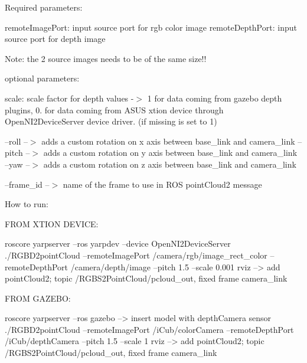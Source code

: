 Required parameters\+:

remote\+Image\+Port\+: input source port for rgb color image remote\+Depth\+Port\+: input source port for depth image

Note\+: the 2 source images needs to be of the same size!!

optional parameters\+:

scale\+: scale factor for depth values -\/$>$ 1 for data coming from gazebo depth plugins, 0. for data coming from A\+S\+US xtion device through Open\+N\+I2\+Device\+Server device driver. (if missing is set to 1)

--roll --$>$ adds a custom rotation on x axis between base\+\_\+link and camera\+\_\+link --pitch --$>$ adds a custom rotation on y axis between base\+\_\+link and camera\+\_\+link --yaw --$>$ adds a custom rotation on z axis between base\+\_\+link and camera\+\_\+link

--frame\+\_\+id --$>$ name of the frame to use in R\+OS point\+Cloud2 message

How to run\+:

F\+R\+OM X\+T\+I\+ON D\+E\+V\+I\+CE\+: 
\begin{DoxyCode}
roscore
yarpserver --ros
yarpdev --device OpenNI2DeviceServer
./RGBD2pointCloud --remoteImagePort /camera/rgb/image\_rect\_color  --remoteDepthPort /camera/depth/image
       --pitch 1.5 --scale 0.001
rviz  --> add pointCloud2; topic /RGBS2PointCloud/pcloud\_out, fixed frame camera\_link
\end{DoxyCode}


F\+R\+OM G\+A\+Z\+E\+BO\+: 
\begin{DoxyCode}
roscore
yarpserver --ros
gazebo  --> insert model with depthCamera sensor
./RGBD2pointCloud  --remoteImagePort /iCub/colorCamera  --remoteDepthPort /iCub/depthCamera --pitch 1.5
       --scale 1
rviz  --> add pointCloud2; topic /RGBS2PointCloud/pcloud\_out, fixed frame camera\_link
\end{DoxyCode}
 